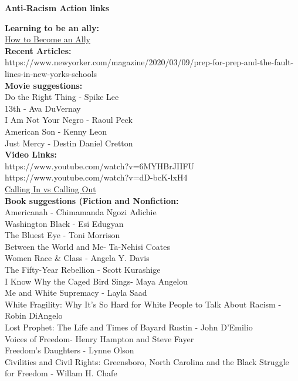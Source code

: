 \documentclass{article}\usepackage[]{graphicx}\usepackage[]{color}
\begin{document}
\noindent \textbf{\Large{Anti-Racism Action links}}

\large\textbf{Learning to be an ally:} \\
\href{https://docs.google.com/document/u/0/d/1H-Vxs6jEUByXylMS2BjGH1kQ7mEuZnHpPSs1Bpaqmw0/mobilebasic?urp=gmail_link}{How to Become an Ally} \\


\large\textbf{Recent Articles:}\\
https://www.newyorker.com/magazine/2020/03/09/prep-for-prep-and-the-fault-lines-in-new-yorks-schools \\


\large\textbf{Movie suggestions:} \\
Do the Right Thing - Spike Lee \\
13th - Ava DuVernay \\
I Am Not Your Negro - Raoul Peck \\
American Son - Kenny Leon \\
Just Mercy - Destin Daniel Cretton \\


\large\textbf{Video Links:} \\
https://www.youtube.com/watch?v=6MYHBrJIIFU \\
https://www.youtube.com/watch?v=dD-bcK-lxH4 \\
\href{https://www.youtube.com/watch?v=zYX2CHFT4EM}{Calling In vs Calling Out} \\


\large\textbf{Book suggestions (Fiction and Nonfiction:} \\
Americanah - Chimamanda Ngozi Adichie \\
Washington Black - Esi Edugyan \\
The Bluest Eye - Toni Morrison \\
Between the World and Me- Ta-Nehisi Coates \\
Women Race \& Class - Angela Y. Davis \\
The Fifty-Year Rebellion - Scott Kurashige \\
I Know Why the Caged Bird Sings- Maya Angelou \\
Me and White Supremacy - Layla Saad \\
White Fragility: Why It's So Hard for White People to Talk About Racism - Robin DiAngelo \\
Lost Prophet: The Life and Times of Bayard Rustin - John D'Emilio \\
Voices of Freedom- Henry Hampton and Steve Fayer \\
Freedom's Daughters - Lynne Olson \\
Civilities and Civil Rights: Greensboro, North Carolina and the Black Struggle for Freedom - Willam H. Chafe \\
\end{document}
